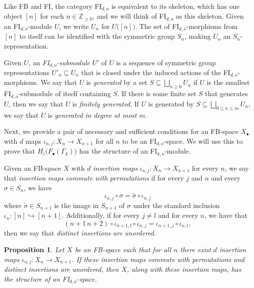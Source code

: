 \documentclass[pagebackref,colorlinks,citecolor=blue,linkcolor=blue,urlcolor=blue,filecolor=blue]{article}
\newtheorem{prop}[thm]{Proposition}
\theoremstyle{definition}\newtheorem{definition}[thm]{Definition}
\theoremstyle{definition}
\newcommand{\Z}{\ensuremath{\mathbb{Z}}}
\begin{document}
Like FB and FI, the category FI$_{d, o}$ is equivalent to its skeleton, which has one object $[n]$ for each $n\in \Z_{\ge0}$, and we will think of FI$_{d,o}$ as this skeleton.
Given an FI$_{d,o}$-module $U$, we write $U_{n}$ for $U\big([n]\big)$. 
The set of FI$_{d,o}$-morphisms from $[n]$ to itself can be identified with the symmetric group $S_{n}$, making $U_{n}$ an $S_{n}$-representation.

Given $U$, an \emph{FI$_{d,o}$-submodule} $U'$ of $U$ is a sequence of symmetric group representations $U'_{n}\subseteq U_{n}$ that is closed under the induced actions of the FI$_{d,o}$-morphisms.
We say that $U$ is \emph{generated} by a set $S\subseteq \bigsqcup_{n\ge 0}U_{n}$ if $U$ is the smallest FI$_{d,o}$-submodule of itself containing $S$. 
If there is some finite set $S$ that generates $U$, then we say that $U$ is \emph{finitely generated}.
If $U$ is generated by $S\subseteq \bigsqcup_{0\le n\le m}U_{n}$, we say that $U$ is \emph{generated in degree at most $m$}.

Next, we provide a pair of necessary and sufficient conditions for an FB-space $X_{\bullet}$ with $d$ maps $\iota_{n, j}:X_{n}\to X_{n+1}$ for all $n$ to be an FI$_{d,o}$-space.
We will use this to prove that $H_{i}\big(F_{\bullet}(\Gamma_{k})\big)$ has the structure of an FI$_{k,o}$-module.

Given an FB-space $X$ with $d$ \emph{insertion maps} $\iota_{n, j}:X_{n}\to X_{n+1}$ for every $n$, we say that \emph{insertion maps commute with permutations} if for every $j$ and $n$ and every $\sigma\in S_{n}$, we have
\[
\iota_{n, j}\circ\sigma=\tilde{\sigma}\circ \iota_{n, j}
\]
where $\tilde{\sigma}\in S_{n+1}$ is the image in $S_{n+1}$ of $\sigma$ under the standard inclusion $\iota_{n}:[n]\hookrightarrow[n+1]$.
Additionally, if for every $j\neq l$ and for every $n$, we have that 
\[
(n+1\, n+2)\circ \iota_{n+1, l}\circ \iota_{n, j}=\iota_{n+1, j}\circ \iota_{n, l},
\]
then we say that \emph{distinct insertions are unordered}.


\begin{prop}\label{conditions for FIOk space}
Let $X$ be an FB-space such that for all $n$ there exist $d$ insertion maps $\iota_{n, j}:X_{n}\to X_{n+1}$.
If these insertion maps commute with permutations and distinct insertions are unordered, then $X$, along with these insertion maps, has the structure of an FI$_{d,o}$-space.
\end{prop}
\end{document}
